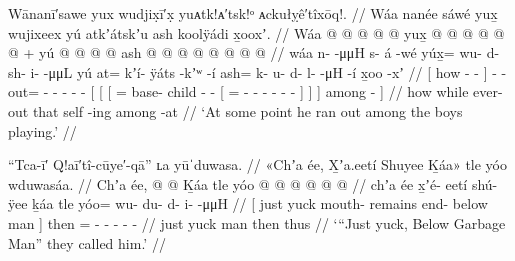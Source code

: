 \ex\label{ex:89-116-ran-out-among-boys-playing}%
%
\begingl
	\glpreamble	Wānanī′sawe yux wudjix̣ī′x̣ yuᴀtk!ᴀ′tsk!ᵒ ᴀckułỵê′tîxōq!. //
	\glpreamble	Wáa nanée sáwé yux̱ wujixeex yú atkʼátskʼu ash koolÿádi x̱ooxʼ. //
	\gla	{} Wáa  @ {} @ {} @ {} {}  @ {} @ {}
		yux̱ @  @ {} @ {} @ {} @ {} @ {} +
		{} {} yú {}  @ {} @ {} @ {} @ {}
			{} ash @  @ {} @ {} @ {} @ {} @ {} @ {} {} {} {}
			 @ {} {} //
	\glb	{} wáa n-  -μμH {} {} s- á -wé
		yúx̱= wu- d- sh- i-  -μμL
		{} {} yú {} at= kʼí- ÿáts -kʼʷ -í
			{} ash= k- u- d- l-  -μH -í {} {} {}
			x̱oo -xʼ {} //
	\glc	{}[ how -  - \· {}] -  -
		out= - - - -  -
		{}[ {}[  {}[ = base- child - -
			{}[ = - - - -
				 - - {}] {}] {}]
			among - {}] //
	\gld	{} how  {} {} \·while {} ever-  {}
		out\•  {} {} {} {} {}
		{} {} that {}  {} {} {} {}
			{} self\•  {} {} {} {} {} -ing {} {} {}
			among -at {} //
	\glft	‘At some point he ran out among the boys playing.’
		//
\endgl
\xe

\ex\label{ex:89-117-call-him-below-garbage-man}%
%
\begingl
	\glpreamble	“Tca-ī′ Q!aī′tî-cūye′-qā” ʟa yūˈduwasa. //
	\glpreamble	«\!Chʼa ée, X̱ʼa.eetí Shuyee Ḵáa\!» tle yóo wduwasáa. //
	\gla	{} Chʼa ée,  @ {}  @ {} Ḵáa {}
		tle yóo @  @ {} @ {} @ {} @ {} @ {} //
	\glb	{} chʼa ée x̱ʼé- eetí shú- ÿee ḵáa {}
		tle yóo= wu- du- d- i-  -μμH //
	\glc	{}[ just yuck mouth- remains end- below man {}]
		then = - - - -  - //
	\gld	{} just yuck  {}  {} man {}
		then thus\•  {} {} {} {} {} //
	\glft	‘“Just yuck, Below Garbage Man” they called him.’
		//
\endgl
\xe

